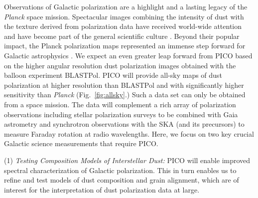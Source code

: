 \documentclass[PICOReport.tex]{subfiles}
\begin{document}
Observations of Galactic polarization are a highlight and a lasting legacy of the {\em Planck} space mission. 
Spectacular images combining the intensity of dust with the texture derived from polarization data 
have received world-wide attention and have become part of the general scientific culture \citep{PlanckI2015}. 
Beyond their popular impact, the Planck polarization maps represented an 
immense step forward for Galactic astrophysics \citep{Planck2018:XII}. 
We expect an even greater leap forward from PICO based on the higher angular resolution dust polarization images obtained with the balloon experiment BLASTPol.  
PICO will provide all-sky maps of dust polarization at higher resolution than BLASTPol and with significantly higher sensitivity than {\em Planck} (Fig.~\ref{fig:allsky}.) Such a data set can only be obtained from a space mission. 
The data will complement a rich array of polarization observations including stellar polarization surveys to be 
combined with Gaia astrometry and synchrotron 
observations with the SKA (and its precursors) to measure
Faraday rotation at radio wavelengths. 
Here, we focus on two key crucial Galactic science measurements that require PICO.

(1) {\em Testing Composition Models of Interstellar Dust:}
PICO will enable improved spectral characterization of Galactic polarization. 
This in turn enables us to refine and test models of dust composition and grain alignment, which are of interest for the interpretation of dust polarization data at large.
\end{document}
